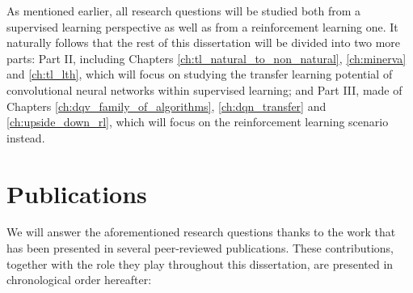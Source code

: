 As mentioned earlier, all research questions will be studied both from a supervised learning perspective as well as from a reinforcement learning one. It naturally follows that the rest of this dissertation will be divided into two more parts: Part II, including Chapters \ref{ch:tl_natural_to_non_natural}, \ref{ch:minerva} and \ref{ch:tl_lth}, which will focus on studying the transfer learning potential of convolutional neural networks within supervised learning; and Part III, made of Chapters \ref{ch:dqv_family_of_algorithms}, \ref{ch:dqn_transfer} and \ref{ch:upside_down_rl}, which will focus on the reinforcement learning scenario instead. 

\section*{Publications}

We will answer the aforementioned research questions thanks to the work that has been presented in several peer-reviewed publications. These contributions, together with the role they play throughout this dissertation, are presented in chronological order hereafter:

